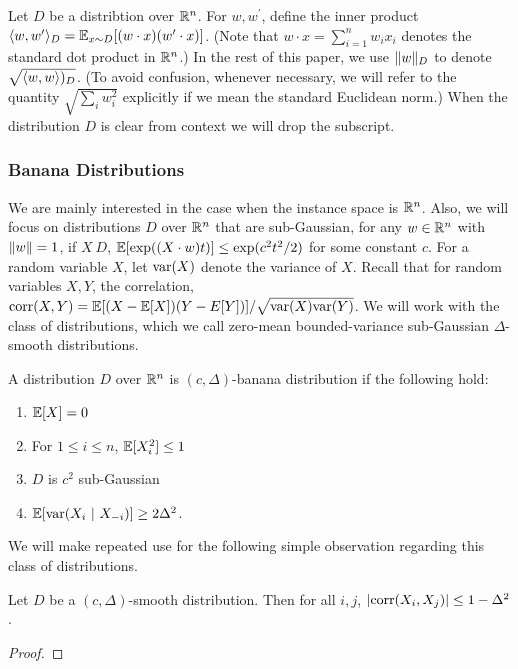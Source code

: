 Let $D$ be a distribtion over $\mathbb{R}^n$. For $w, w^\prime$, define the inner
product $\langle w, w^\prime \rangle_D = \mathbb{E}_{x \sim D}[(w \cdot x) (w^\prime \cdot x)]$.
(Note that $w \cdot x = \sum_{i = 1}^n w_i x_i$ denotes the standard dot product
in $\mathbb{R}^n$.) In the rest of this paper, we use $\Vert w \Vert_D$ to denote
$\sqrt{\langle w, w \rangle)_D}$. (To avoid confusion, whenever necessary, we
will refer to the quantity $\sqrt{\sum_{i} w_i^2}$ explicitly if we mean the standard
Euclidean norm.) When the distribution $D$ is clear from context we will drop
the subscript.



\subsubsection{Banana Distributions}

We are mainly interested in the case when the instance space is $\mathbb{R}^n$.
Also, we will focus on distributions $D$ over $\mathbb{R}^n$ that are sub-Gaussian,
\ie for any $w \in \mathbb{R}^n$ with $\Vert w \Vert = 1$, if $X ~ D$, $\mathbb{E}[\exp((X
\cdot w) t)] \leq \exp(c^2t^2/2)$ for some constant $c$.  For a random variable
$X$, let $\mathrm{var}(X)$ denote the variance of $X$. Recall that for random variables
$X, Y$, the correlation, $\mathrm{corr}(X, Y) = \mathbb{E}[(X - \mathbb{E}[X]) (Y - E[Y])]/\sqrt{\mathrm{var}(X)
\mathrm{var}(Y)}$. We will work with the class of distributions, which we call zero-mean
bounded-variance sub-Gaussian $\Delta$-smooth distributions.


\begin{definition} A distribution $D$ over $\mathbb{R}^n$ is $(c, \Delta)$-banana
distribution if the following hold:
\begin{enumerate}
\item $\mathbb{E}[X] = 0$
\item For $1 \leq i \leq n$, $\mathbb{E}[X_i^2] \leq 1$
\item $D$ is $c^2$ sub-Gaussian
\item $\mathbb{E}[\mathrm{var}(X_i ~|~ X_{-i})] \geq 2 \Delta^2$.
\end{enumerate}
\end{definition}

We will make repeated use for the following simple observation regarding this
class of distributions.

\begin{lemma} Let $D$ be a $(c, \Delta)$-smooth distribution. Then for all $i, j$,
$|\mathrm{corr}(X_i, X_j)| \leq 1 - \Delta^2$.
\end{lemma}
\begin{proof}

\end{proof}

